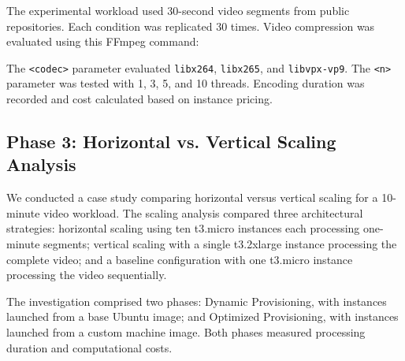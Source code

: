 \documentclass[conference]{IEEEtran}
\begin{document}
	The experimental workload used 30-second video segments from public repositories. Each condition was replicated 30 times. Video compression was evaluated using this FFmpeg command:
	
	\begin{center}
		{\ttfamily\scriptsize
		}
	\end{center}
	
	The \texttt{<codec>} parameter evaluated \texttt{libx264}, \texttt{libx265}, and \texttt{libvpx-vp9}. The \texttt{<n>} parameter was tested with 1, 3, 5, and 10 threads. Encoding duration was recorded and cost calculated based on instance pricing.
	
	\subsection{Phase 3: Horizontal vs. Vertical Scaling Analysis}
	
	We conducted a case study comparing horizontal versus vertical scaling for a 10-minute video workload. The scaling analysis compared three architectural strategies: horizontal scaling using ten t3.micro instances each processing one-minute segments; vertical scaling with a single t3.2xlarge instance processing the complete video; and a baseline configuration with one t3.micro instance processing the video sequentially.
	
	The investigation comprised two phases: Dynamic Provisioning, with instances launched from a base Ubuntu image; and Optimized Provisioning, with instances launched from a custom machine image. Both phases measured processing duration and computational costs.
\end{document}
